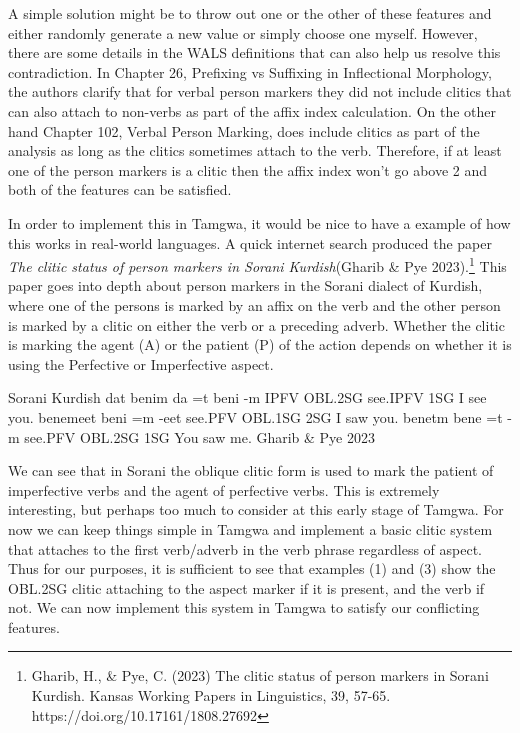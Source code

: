 \documentclass[a4paper,12pt,twoside,openright]{memoir}
\begin{document}
A simple solution might be to throw out one or the other of these features and either randomly generate a new value or simply choose one myself.  However, there are some details in the WALS definitions that can also help us resolve this contradiction.  In Chapter 26, Prefixing vs Suffixing in Inflectional Morphology, the authors clarify that for verbal person markers they did not include clitics that can also attach to non-verbs as part of the affix index calculation.  On the other hand Chapter 102, Verbal Person Marking, does include clitics as part of the analysis as long as the clitics sometimes attach to the verb.  Therefore, if at least one of the person markers is a clitic then the affix index won't go above 2 and both of the features can be satisfied.

In order to implement this in Tamgwa, it would be nice to have a example of how this works in real-world languages.  A quick internet search produced the paper \textit{The clitic status of person markers in Sorani Kurdish}(Gharib \& Pye 2023).\footnote{Gharib, H., \& Pye, C. (2023) The clitic status of person markers in Sorani Kurdish. Kansas Working Papers in Linguistics, 39, 57-65. https://doi.org/10.17161/1808.27692}  This paper goes into depth about person markers in the Sorani dialect of Kurdish, where one of the persons is marked by an affix on the verb and the other person is marked by a clitic on either the verb or a preceding adverb.  Whether the clitic is marking the agent (A) or the patient (P) of the action depends on whether it is using the Perfective or Imperfective aspect.

\begin{examples}
    \ex
    \lect Sorani Kurdish
    \words {} dat  benim
    \bits da =t beni -m
    \gloss IPFV OBL.2SG see.IPFV 1SG
    \tr I see you.
    \ex
    \words {} benemeet
    \bits beni =m -eet
    \gloss see.PFV OBL.1SG 2SG
    \tr I saw you.
    \ex
    \words {} benetm
    \bits bene =t -m
    \gloss see.PFV OBL.2SG 1SG
    \tr You saw me.
    \source Gharib \& Pye 2023
\end{examples}

We can see that in Sorani the oblique clitic form is used to mark the patient of imperfective verbs and the agent of perfective verbs.  This is extremely interesting, but perhaps too much to consider at this early stage of Tamgwa.  For now we can keep things simple in Tamgwa and implement a basic clitic system that attaches to the first verb/adverb in the verb phrase regardless of aspect.  Thus for our purposes, it is sufficient to see that examples (1) and (3) show the OBL.2SG clitic attaching to the aspect marker if it is present, and the verb if not.  We can now implement this system in Tamgwa to satisfy our conflicting features.
\end{document}
